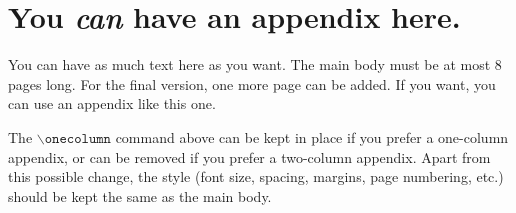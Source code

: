 \documentclass{article}
\theoremstyle{plain}
\theoremstyle{definition}
\theoremstyle{remark}
\begin{document}



\newpage
\appendix
\onecolumn
\section{You \emph{can} have an appendix here.}

You can have as much text here as you want. The main body must be at most $8$
pages long. For the final version, one more page can be added. If you want, you
can use an appendix like this one.

The $\mathtt{\backslash onecolumn}$ command above can be kept in place if you
prefer a one-column appendix, or can be removed if you prefer a two-column
appendix.  Apart from this possible change, the style (font size, spacing,
margins, page numbering, etc.) should be kept the same as the main body.
\end{document}

